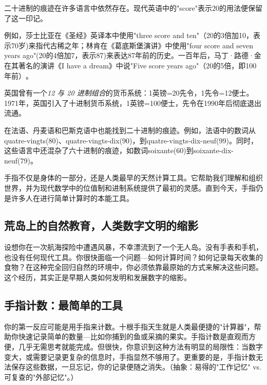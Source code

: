 二十进制的痕迹在许多语言中依然存在。现代英语中的"score"表示20的用法便保留了这一印记。

例如，莎士比亚在《圣经》英译本中使用"three score and ten"（20的3倍加10，表示70岁)来指代古稀之年；林肯在《葛底斯堡演讲》中使用"four score and seven years ago"(20的4倍加7，表示87)来表达87年前的历史。一百年后，马丁·路德·金在其著名的演讲《I have a dream》中说"Five score years ago"​（20的5倍，即100年前）​。

英国曾有一个\emph{12 与 20 进制组合}的货币系统：1英镑=20先令，1先令=12便士。1971年，英国引入了十进制货币系统，1英镑=100便士，先令在1990年后彻底退出流通。

在法语、丹麦语和巴斯克语中也能找到二十进制的痕迹。例如，法语中的数词从quatre-vingts(80)​、quatre-vingts-dix(90)​，到quatre-vingts-dix-neuf(99)。同时，这些语言中还混杂了六十进制的痕迹，如数词soixante(60)到soixante-dix-neuf(79)。

手指不仅是身体的一部分，还是人类最早的天然计算工具。它帮助我们理解和组织世界，并为现代数学中的位值制和进制系统提供了最初的灵感。直到今天，手指仍是许多人在进行简单计算时的本能工具。

\subsection{荒岛上的自然教育，人类数字文明的缩影}


设想你在一次航海探险中遭遇风暴，不幸漂流到了一个无人岛。没有手表和手机，也没有任何现代工具。你很快面临一个问题---如何计算时间？如何记录每天收集的食物？在这种完全回归自然的环境中，你必须依靠最原始的方式来解决这些问题。这个经历，其实正是早期人类如何发明和发展数字的缩影。

\subsection*{手指计数：最简单的工具}


你的第一反应可能是用手指来计数。十根手指天生就是人类最便捷的"计算器"，帮助你快速记录简单的数量---比如你捕到的鱼或采摘的果实。手指计数是直观而方便，几乎无需思考就能完成。但很快，你意识到这种方法有明显的局限性：当数字变大，或需要记录更复杂的信息时，手指显然不够用了。更重要的是，手指计数无法保存这些数据，一旦忘记，你的记录便随之消失。{（抽象：易得的"工作记忆" vs. 可复查的"外部记忆"。）}

